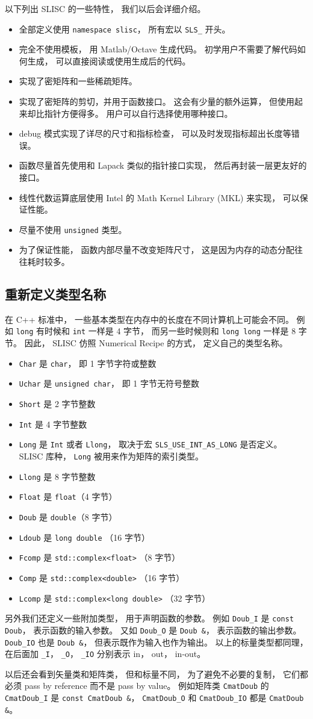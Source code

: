 以下列出 SLISC 的一些特性， 我们以后会详细介绍。
\begin{itemize}
\item 全部定义使用 \verb|namespace slisc|， 所有宏以 \verb|SLS_| 开头。
\item 完全不使用模板， 用 Matlab/Octave 生成代码。 初学用户不需要了解代码如何生成， 可以直接阅读或使用生成后的代码。
\item 实现了密矩阵和一些稀疏矩阵。
\item 实现了密矩阵的剪切，并用于函数接口。 这会有少量的额外运算， 但使用起来却比指针方便得多。 用户可以自行选择使用哪种接口。
\item debug 模式实现了详尽的尺寸和指标检查， 可以及时发现指标超出长度等错误。
\item 函数尽量首先使用和 Lapack 类似的指针接口实现， 然后再封装一层更友好的接口。
\item 线性代数运算底层使用 Intel 的 Math Kernel Library (MKL) 来实现， 可以保证性能。
\item 尽量不使用 \verb|unsigned| 类型。
\item 为了保证性能， 函数内部尽量不改变矩阵尺寸， 这是因为内存的动态分配往往耗时较多。
\end{itemize}

\subsection{重新定义类型名称}
在 C++ 标准中， 一些基本类型在内存中的长度在不同计算机上可能会不同。 例如 \verb|long| 有时候和 \verb|int| 一样是 4 字节， 而另一些时候则和 \verb|long long| 一样是 8 字节。 因此， SLISC 仿照 Numerical Recipe \cite{NR3} 的方式， 定义自己的类型名称。
\begin{itemize}
\item \verb|Char| 是 \verb|char|， 即 1 字节字符或整数
\item \verb|Uchar| 是 \verb|unsigned char|， 即 1 字节无符号整数
\item \verb|Short| 是 2 字节整数
\item \verb|Int| 是 4 字节整数
\item \verb|Long| 是 \verb|Int| 或者 \verb|Llong|， 取决于宏 \verb|SLS_USE_INT_AS_LONG| 是否定义。 SLISC 库种， \verb|Long| 被用来作为矩阵的索引类型。
\item \verb|Llong| 是 8 字节整数
\item \verb|Float| 是 \verb|float|（4 字节）
\item \verb|Doub| 是 \verb|double|（8 字节）
\item \verb|Ldoub| 是 \verb|long double| （16 字节）
\item \verb|Fcomp| 是 \verb|std::complex<float>| （8 字节）
\item \verb|Comp| 是 \verb|std::complex<double>| （16 字节）
\item \verb|Lcomp| 是 \verb|std::complex<long double>| （32 字节）
\end{itemize}
另外我们还定义一些附加类型， 用于声明函数的参数。 例如 \verb|Doub_I| 是 \verb|const Doub|， 表示函数的输入参数。 又如 \verb|Doub_O| 是 \verb|Doub &|， 表示函数的输出参数。 \verb|Doub_IO| 也是 \verb|Doub &|， 但表示既作为输入也作为输出。 以上的标量类型都同理， 在后面加 \verb|_I|， \verb|_O|， \verb|_IO| 分别表示 in， out， in-out。

以后还会看到矢量类和矩阵类， 但和标量不同， 为了避免不必要的复制， 它们都必须 pass by reference 而不是 pass by value。 例如矩阵类 \verb|CmatDoub| 的 \verb|CmatDoub_I| 是 \verb|const CmatDoub &|， \verb|CmatDoub_O| 和 \verb|CmatDoub_IO| 都是 \verb|CmatDoub &|。
